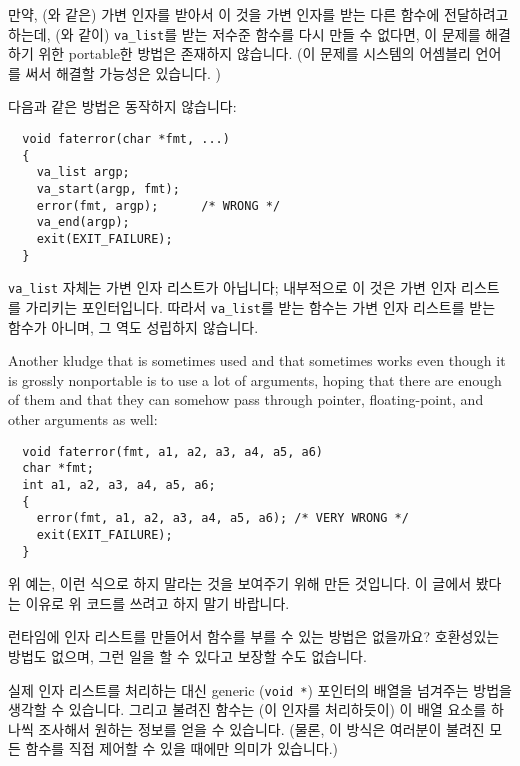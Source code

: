 \begin{faq}
        만약, (와 같은) 가변 인자를 받아서 이 것을 가변 인자를 받는 다른
        함수에 전달하려고 하는데, (와 같이) \verb+va_list+를 받는 
        저수준 함수를 다시 만들 수 없다면, 이 문제를 해결하기 위한 portable한 방법은
        존재하지 않습니다. (이 문제를 시스템의 어셈블리 언어를 써서 해결할 가능성은
        있습니다. )

        다음과 같은 방법은 동작하지 않습니다:
\begin{verbatim}
  void faterror(char *fmt, ...)
  {
    va_list argp;
    va_start(argp, fmt);
    error(fmt, argp);      /* WRONG */
    va_end(argp);
    exit(EXIT_FAILURE);
  }
\end{verbatim}
	\noindent \verb+va_list+ 자체는 가변 인자 리스트가 아닙니다; 내부적으로
        이 것은 가변 인자 리스트를 가리키는 포인터입니다. 따라서 \verb+va_list+를
        받는 함수는 가변 인자 리스트를 받는 함수가 아니며, 그 역도 성립하지 않습니다.

        Another kludge that is sometimes used and that sometimes works even
        though it is grossly nonportable is to use a lot of  arguments,
        hoping that there are enough of them and that they can somehow pass
        through pointer, floating-point, and other arguments as well:
\begin{verbatim}
  void faterror(fmt, a1, a2, a3, a4, a5, a6)
  char *fmt;
  int a1, a2, a3, a4, a5, a6;
  {
    error(fmt, a1, a2, a3, a4, a5, a6); /* VERY WRONG */
    exit(EXIT_FAILURE);
  }
\end{verbatim}
	위 예는, 이런 식으로 하지 말라는 것을 보여주기 위해 만든 것입니다.
        이 글에서 봤다는 이유로 위 코드를 쓰려고 하지 말기 바랍니다.
\end{faq}

\begin{faq}
	런타임에 인자 리스트를 만들어서 함수를 부를 수 있는 방법은 없을까요?
\A
	호환성있는 방법도 없으며, 그런 일을 할 수 있다고 보장할 수도 없습니다.

	실제 인자 리스트를 처리하는 대신 generic (\verb+void *+) 포인터의 배열을
	넘겨주는 방법을 생각할 수 있습니다. 그리고 불려진 함수는 (이
         인자를 처리하듯이) 이 배열 요소를 하나씩 조사해서 원하는
        정보를 얻을 수 있습니다. (물론, 이 방식은 여러분이 불려진 모든 함수를 직접
        제어할 수 있을 때에만 의미가 있습니다.) 

\end{faq}

%
%
